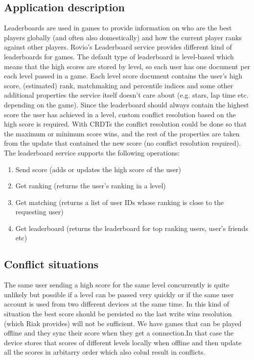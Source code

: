 \documentclass[11pt,a4paper]{report}
\begin{document}
\subsection{Application description}
Leaderboards are used in games to provide information on who are the best players globally (and often also domestically) and how the current player ranks against other players.
Rovio's Leaderboard service provides different kind of leaderboards for games. The default type of leaderboard is level­-based which means that the high scores are stored by level, so each user has one document per each level passed in a game. Each level score document contains the user's high score, (estimated) rank, matchmaking and percentile indices and some other additional properties the service itself doesn't care about (e.g. stars, lap time etc. depending on the game).
Since the leaderboard should always contain the highest score the user has achieved in a level, custom conflict resolution based on the high score is required. With CRDTs the conflict resolution could be done so that the maximum or minimum score wins, and the rest of the properties are taken from the update that contained the new score (no conflict resolution required).
The leaderboard service supports the following operations:
\begin{enumerate}
\item Send score (adds or updates the high score of the user)
\item Get ranking (returns the user's ranking in a level)
\item Get matching (returns a list of user IDs whose ranking is close to the requesting user)
\item Get leaderboard (returns the leaderboard for top ranking users, user's friends etc)
\end{enumerate}

\subsection{Conflict situations}
The same user sending a high score for the same level concurrently is quite unlikely but possible if a level can be passed very quickly or if the same user account is used from two different devices at the same time. In this kind of situation the best score should be persisted so the last write wins resolution (which Riak provides) will not be sufficient.
We have games that can be played offline and they sync their score when they get a connection.In that case the device stores that scores of different levels locally when offline and then update all the scores in arbitarry order which also colud result in conflicts.
\end{document}
